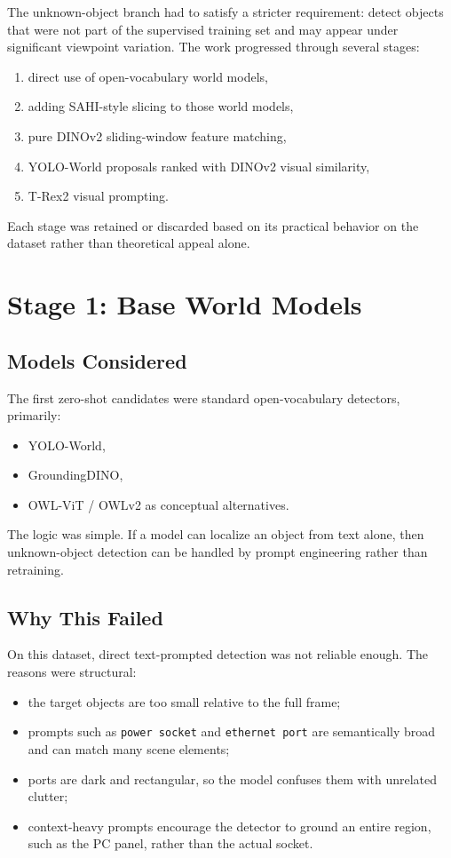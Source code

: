 \documentclass[11pt,a4paper]{article}
\begin{document}
The unknown-object branch had to satisfy a stricter requirement: detect objects that were not part of the supervised training set and may appear under significant viewpoint variation. The work progressed through several stages:
\begin{enumerate}[leftmargin=1.5em]
  \item direct use of open-vocabulary world models,
  \item adding SAHI-style slicing to those world models,
  \item pure DINOv2 sliding-window feature matching,
  \item YOLO-World proposals ranked with DINOv2 visual similarity,
  \item T-Rex2 visual prompting.
\end{enumerate}

Each stage was retained or discarded based on its practical behavior on the dataset rather than theoretical appeal alone.

\section{Stage 1: Base World Models}

\subsection{Models Considered}

The first zero-shot candidates were standard open-vocabulary detectors, primarily:
\begin{itemize}[leftmargin=1.5em]
  \item YOLO-World,
  \item GroundingDINO,
  \item OWL-ViT / OWLv2 as conceptual alternatives.
\end{itemize}

The logic was simple. If a model can localize an object from text alone, then unknown-object detection can be handled by prompt engineering rather than retraining.

\subsection{Why This Failed}

On this dataset, direct text-prompted detection was not reliable enough. The reasons were structural:
\begin{itemize}[leftmargin=1.5em]
  \item the target objects are too small relative to the full frame;
  \item prompts such as \texttt{power socket} and \texttt{ethernet port} are semantically broad and can match many scene elements;
  \item ports are dark and rectangular, so the model confuses them with unrelated clutter;
  \item context-heavy prompts encourage the detector to ground an entire region, such as the PC panel, rather than the actual socket.
\end{itemize}
\end{document}
